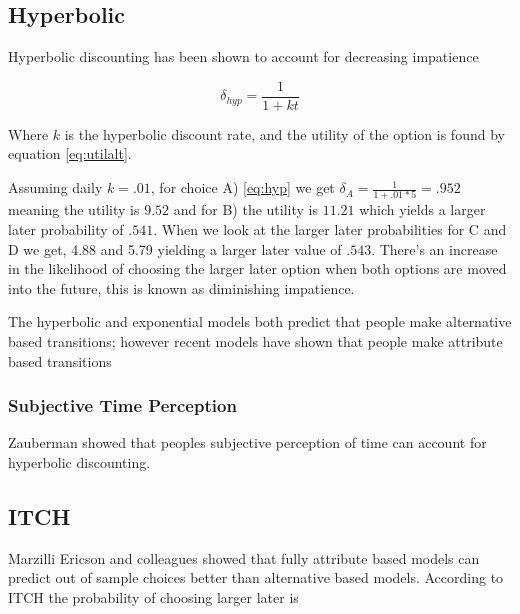 \documentclass[]{article}
\begin{document}
\subsection{Hyperbolic}

Hyperbolic discounting has been shown to account for decreasing impatience

\begin{equation}\label{eq:hyp}
\delta_{hyp} = \frac{1}{1+kt}
\end{equation}

Where $k$ is the hyperbolic discount rate, and the utility of the option is found by equation \ref{eq:utilalt}.

Assuming daily $k = .01$, for choice A) \ref{eq:hyp} we get $\delta_A = \frac{1}{1+.01*5} = .952$ meaning the utility is $9.52$ and for B) the utility is $11.21$ which yields a larger later probability of $.541$. When we look at the larger later probabilities for C and D we get, 4.88 and  5.79 yielding a larger later value of $.543$. There's an increase in the likelihood of choosing the larger later option when both options are moved into the future, this is known as diminishing impatience. 

The hyperbolic and exponential models both predict that people make alternative based transitions; however recent models have shown that people make attribute based transitions



\subsubsection{Subjective Time Perception}

Zauberman showed that peoples subjective perception of time can account for hyperbolic discounting. 

\subsection{ITCH}
\label{ITCH}

Marzilli Ericson and colleagues showed that fully attribute based models can predict out of sample choices better than alternative based models. 
According to ITCH the probability of choosing larger later is

\end{document}
